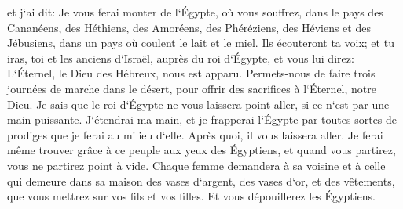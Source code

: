 \verse et j`ai dit: Je vous ferai monter de l`Égypte, où vous souffrez, dans le pays des Cananéens, des Héthiens, des Amoréens, des Phéréziens, des Héviens et des Jébusiens, dans un pays où coulent le lait et le miel. 
\verse Ils écouteront ta voix; et tu iras, toi et les anciens d`Israël, auprès du roi d`Égypte, et vous lui direz: L`Éternel, le Dieu des Hébreux, nous est apparu. Permets-nous de faire trois journées de marche dans le désert, pour offrir des sacrifices à l`Éternel, notre Dieu. 
\verse Je sais que le roi d`Égypte ne vous laissera point aller, si ce n`est par une main puissante. 
\verse J`étendrai ma main, et je frapperai l`Égypte par toutes sortes de prodiges que je ferai au milieu d`elle. Après quoi, il vous laissera aller. 
\verse Je ferai même trouver grâce à ce peuple aux yeux des Égyptiens, et quand vous partirez, vous ne partirez point à vide. 
\verse Chaque femme demandera à sa voisine et à celle qui demeure dans sa maison des vases d`argent, des vases d`or, et des vêtements, que vous mettrez sur vos fils et vos filles. Et vous dépouillerez les Égyptiens. 

\chapter{}

